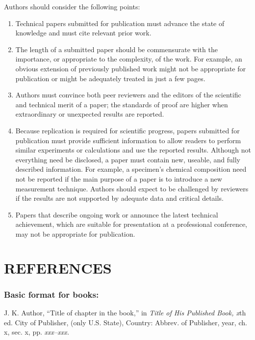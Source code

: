 \documentclass{IEEEoj}
\begin{document}
Authors should consider the following points:

\begin{enumerate}
\item Technical papers submitted for publication must advance the state of knowledge and must cite relevant prior work. 
\item The length of a submitted paper should be commensurate with the importance, or appropriate to the complexity, of the work. For example, an obvious extension of previously published work might not be appropriate for publication or might be adequately treated in just a few pages.
\item Authors must convince both peer reviewers and the editors of the scientific and technical merit of a paper; the standards of proof are higher when extraordinary or unexpected results are reported. 
\item Because replication is required for scientific progress, papers submitted for publication must provide sufficient information to allow readers to perform similar experiments or calculations and use the reported results. Although not everything need be disclosed, a paper must contain new, useable, and fully described information. For example, a specimen's chemical composition need not be reported if the main purpose of a paper is to introduce a new measurement technique. Authors should expect to be challenged by reviewers if the results are not supported by adequate data and critical details.
\item Papers that describe ongoing work or announce the latest technical achievement, which are suitable for presentation at a professional conference, may not be appropriate for publication.
\end{enumerate}

\section*{REFERENCES}

\def\refname{\vadjust{\vspace*{-1em}}} %

\subsubsection*{Basic format for books:}

\begin{thebibliography}{00}
 J. K. Author, ``Title of chapter in the book,'' in \textit{Title of His Published Book, x}th ed. City of Publisher,
(only U.S. State), Country: Abbrev. of Publisher, year, ch. x, sec. x, pp.
\textit{xxx--xxx.}
\end{thebibliography}
\end{document}
